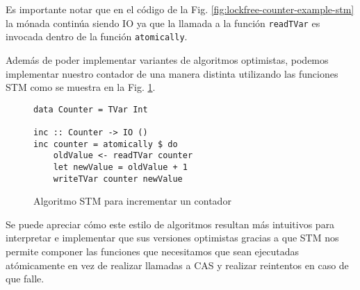 Es importante notar que en el código de la Fig. \ref{fig:lockfree-counter-example-stm} la mónada continúa siendo IO ya que la llamada a la función \texttt{readTVar} es invocada dentro de la función \texttt{atomically}.

Además de poder implementar variantes de algoritmos optimistas, podemos implementar nuestro contador de una manera distinta utilizando las funciones STM como se muestra en la Fig. \ref{fig:counter-example-stm}.

\begin{figure}[!h]
\begin{verbatim}
data Counter = TVar Int

inc :: Counter -> IO ()
inc counter = atomically $ do
    oldValue <- readTVar counter
    let newValue = oldValue + 1
    writeTVar counter newValue
\end{verbatim}
\caption{Algoritmo STM para incrementar un contador}
\label{fig:counter-example-stm}
\end{figure}

Se puede apreciar cómo este estilo de algoritmos resultan más intuitivos para interpretar e implementar que sus versiones optimistas gracias a que STM nos permite componer las funciones que necesitamos que sean ejecutadas atómicamente en vez de realizar llamadas a CAS y realizar reintentos en caso de que falle.
